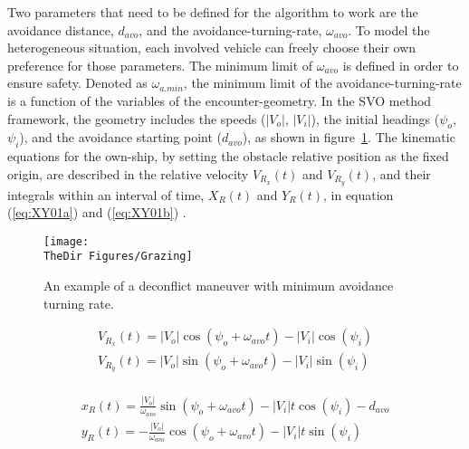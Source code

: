 Two parameters that need to be defined for the algorithm to work are the avoidance distance, $d_{avo}$, and the avoidance-turning-rate, $\omega_{avo}$. To model the heterogeneous situation, each involved vehicle can freely choose their own preference for those parameters. The minimum limit of $\omega_{avo}$ is defined in order to ensure safety. Denoted as $\omega_{a.min}$, the minimum limit of the avoidance-turning-rate is a function of the variables of the encounter-geometry. In the SVO method framework, the geometry includes the speeds ($|V_o|$, $|V_i|$), the initial headings ($\psi_o$, $\psi_i$), and the avoidance starting point ($d_{avo}$), as shown in figure~\ref{f:Grazing}. The kinematic equations for the own-ship, by setting the obstacle relative position as the fixed origin, are described in the relative velocity $V_{R_x}(t)$ and $V_{R_y}(t)$, and their integrals within an interval of time, $X_R(t)$ and $Y_R(t)$, in equation (\ref{eq:XY01a}) and (\ref{eq:XY01b}) .

\begin{figure}
	\centering
	\texttt{[image: \\TheDir Figures/Grazing]}
	\caption{An example of a deconflict maneuver with minimum avoidance turning rate.}
	\label{f:Grazing}
\end{figure}

\begin{equation}
	\label{eq:XY01a}
	\begin{array}{l}
		V_{R_x}(t) = \left| {V_o} \right|\cos \left( {\psi_o+\omega _{avo} t} \right) - {\left| {V_i } \right|} \cos \left( \psi_i \right)\\ 
		V_{R_y}(t) = \left| {V_o } \right| \sin \left( {\psi_o+\omega _{avo} t} \right) - {\left| {V_i } \right|} \sin \left( \psi_i \right)\\ 
	\end{array}
\end{equation}

\begin{equation}
\label{eq:XY01b}
\begin{array}{l}
x_R(t) = \frac{{\left| {V_o } \right|}}{{\omega _{avo} }}\sin \left( {\psi_o+\omega _{avo} t} \right) - {\left| {V_i } \right|} t \cos \left( \psi_i \right)-d_{avo}\\ 
y_R(t) = - \frac{{\left| {V_o } \right|}}{{\omega _{avo} }}\cos \left( {\psi_o+\omega _{avo} t} \right) - {\left| {V_i } \right|} t \sin \left( \psi_i \right)\\ 
\end{array}
\end{equation}

